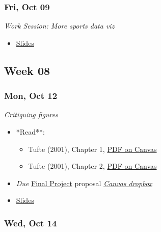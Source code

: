 \documentclass[
  letterpaper,
  DIV=11,
  numbers=noendperiod]{scrartcl}
\providecommand{\tightlist}{%
  \setlength{\itemsep}{0pt}\setlength{\parskip}{0pt}}
\begin{document}
\subsubsection*{Fri, Oct 09}\label{fri-oct-09}

\emph{Work Session: More sports data viz}

\begin{itemize}
\tightlist
\item
  \href{404.qmd}{Slides}
\end{itemize}

\subsection*{Week 08}\label{week-08}

\subsubsection*{Mon, Oct 12}\label{mon-oct-12}

\emph{Critiquing figures}

\begin{itemize}
\tightlist
\item
  *Read**:

  \begin{itemize}
  \tightlist
  \item
    Tufte (2001), Chapter 1,
    \href{https://psu.instructure.com/courses/2484925/files?preview=193922717}{PDF
    on Canvas}
  \item
    Tufte (2001), Chapter 2,
    \href{https://psu.instructure.com/courses/2484925/files?preview=193922717}{PDF
    on Canvas}
  \end{itemize}
\item
   \emph{Due} \href{exercises/final-project.qmd}{Final
  Project} proposal \textbar{}
  \href{https://psu.instructure.com/courses/2484925/assignments/18448439}{
  \emph{Canvas dropbox}}
\item
  \href{404.qmd}{Slides}
\end{itemize}

\subsubsection*{Wed, Oct 14}\label{wed-oct-14}
\end{document}
